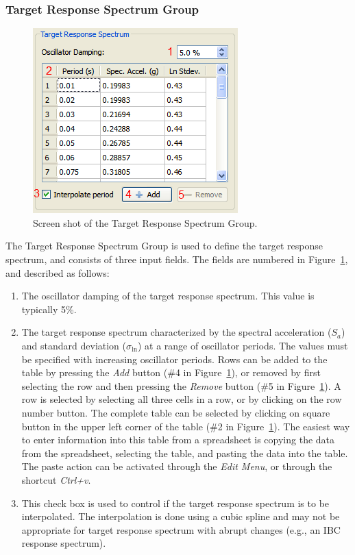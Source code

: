 \documentclass[11pt]{article}
\begin{document}
\FloatBarrier
\subsubsection{Target Response Spectrum Group}
\label{sec:interface:target}

\begin{figure}[h]
  \begin{center}
	\includegraphics[scale=0.7]{screenshots/targetResponseSpectrum}
  \end{center}
  \caption{Screen shot of the Target Response Spectrum Group.}
  \label{fig:interface:targetResponseSpectrum}
\end{figure}

The Target Response Spectrum Group is used to define the target response
spectrum, and consists of three input fields. The fields are numbered in
Figure~\ref{fig:interface:targetResponseSpectrum}, and described as follows:
\begin{enumerate}
  \item The oscillator damping of the target response spectrum. This value is
	typically 5\%.
  \item The target response spectrum characterized by the spectral acceleration
	($S_a$) and standard deviation ($\sigma_{\ln}$) at a range of oscillator
	periods. The values must be specified with increasing oscillator periods.
	Rows can be added to the table by pressing the \emph{Add} button (\#4 in
	Figure~\ref{fig:interface:targetResponseSpectrum}), or removed by first
	selecting the row and then pressing the \emph{Remove} button (\#5 in
	Figure~\ref{fig:interface:targetResponseSpectrum}). A row is selected by
	selecting all three cells in a row, or by clicking on the row number button.
	The complete table can be selected by clicking on square button in the upper
	left corner of the table (\#2 in
	Figure~\ref{fig:interface:targetResponseSpectrum}). The easiest way to enter
	information into this table from a spreadsheet is copying the data from the
	spreadsheet, selecting the table, and pasting the data into the table. The
	paste action can be activated through the \emph{Edit Menu}, or through the
	shortcut \emph{Ctrl+v}.
  \item This check box is used to control if the target response spectrum is to
	be interpolated. The interpolation is done using a cubic spline and may not
	be appropriate for target response spectrum with abrupt changes (e.g., an
	IBC response spectrum).
\end{enumerate}
\end{document}
